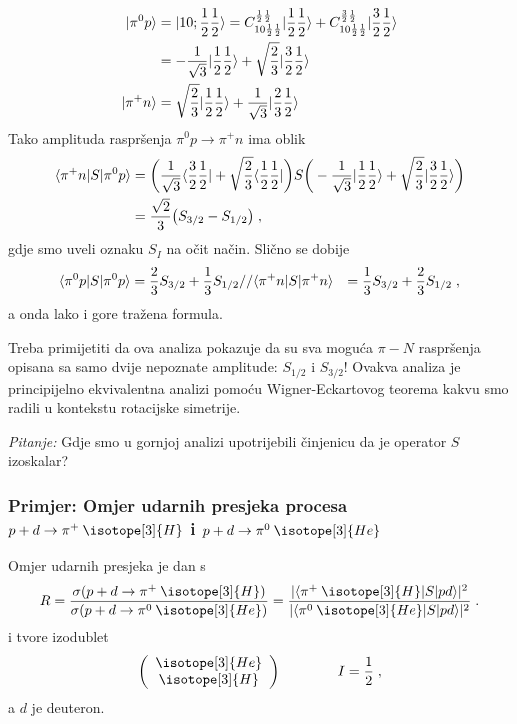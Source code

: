 \begin{align}
| \pi^0 p \rangle &= 
| 1 0; \frac{1}{2} \frac{1}{2}  \rangle = C^{\frac{1}{2} \frac{1}{2}}_{1 0 \frac{1}{2} \frac{1}{2}}
| \frac{1}{2} \frac{1}{2} \rangle + C^{\frac{3}{2} \frac{1}{2}}_{1 0 \frac{1}{2} \frac{1}{2}}
| \frac{3}{2} \frac{1}{2} \rangle \\
&= -\frac{1}{\sqrt{3}} | \frac{1}{2} \frac{1}{2} \rangle +\sqrt{\frac{2}{3}} | \frac{3}{2} \frac{1}{2} \rangle \\
| \pi^+ n \rangle &= \sqrt{\frac{2}{3}} | \frac{1}{2} \frac{1}{2} \rangle + 
\frac{1}{\sqrt{3}} | \frac{2}{3} \frac{1}{2} \rangle
\end{align}
Tako amplituda raspršenja $\pi^0 p \to \pi^+ n$ ima oblik
\begin{align}
\langle \pi^+ n |S| \pi^0 p  \rangle &=
\bigg( \frac{1}{\sqrt{3}} \langle \frac{3}{2} \frac{1}{2} | + \sqrt{\frac{2}{3}}
\langle \frac{1}{2} \frac{1}{2} | \bigg) S
\bigg(-\frac{1}{\sqrt{3}} | \frac{1}{2} \frac{1}{2} \rangle +\sqrt{\frac{2}{3}} | \frac{3}{2}\frac{1}{2} \rangle \bigg) \\
&= \frac{\sqrt{2}}{3} \big( S_{3/2} - S_{1/2} \big) \;,
\end{align}
gdje smo uveli oznaku $S_I$ na očit način. Slično se dobije
\begin{align}
\langle \pi^0 p |S| \pi^0 p  \rangle &= \frac{2}{3}S_{3/2} + \frac{1}{3} S_{1/2} //
\langle \pi^+ n |S| \pi^+ n  \rangle &= \frac{1}{3}S_{3/2} + \frac{2}{3} S_{1/2}  \;,
\end{align}
a onda lako i gore tražena formula.

Treba primijetiti da ova analiza pokazuje da su sva moguća $\pi - N$ raspršenja
opisana sa samo dvije nepoznate amplitude: $S_{1/2}$ i $S_{3/2}$!
Ovakva analiza je principijelno ekvivalentna analizi pomoću Wigner-Eckartovog
teorema kakvu smo radili u kontekstu rotacijske simetrije.

\emph{Pitanje:} Gdje smo u gornjoj analizi upotrijebili činjenicu
da je operator $S$ izoskalar?

\subsubsection*{Primjer: Omjer udarnih presjeka procesa 
$p + d \to  \pi^+ \:\isotope[3]{H}$ i $p + d \to  \pi^0 \:\isotope[3]{He}$}

Omjer udarnih presjeka je dan s
\begin{equation}
 R = \frac{\sigma(p + d \to  \pi^+ \:\isotope[3]{H})}
{\sigma(p + d \to  \pi^0 \:\isotope[3]{He})} = 
\frac{|\bra{\pi^+ \:\isotope[3]{H}}S\ket{p d} |^2}
     {|\bra{\pi^0 \:\isotope[3]{He}}S\ket{p d}|^2} \;.
\end{equation}
 i  tvore izodublet
\begin{equation}
   \left(
\begin{array}{c}
\isotope[3]{He} \\ \isotope[3]{H}
\end{array}\right) \qquad \qquad I=\fhalf \;,
\end{equation}
a $d$ je deuteron.

